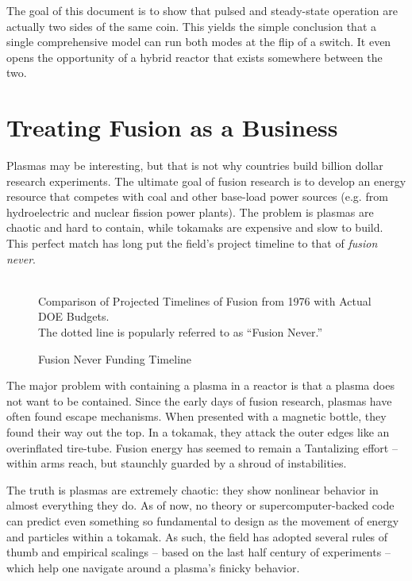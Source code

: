 The goal of this document is to show that pulsed and steady-state operation are actually two sides of the same coin. This yields the simple conclusion that a single comprehensive model can run both modes at the flip of a switch. It even opens the opportunity of a hybrid reactor that exists somewhere between the two.

\section{Treating Fusion as a Business}

Plasmas may be interesting, but that is not why countries build billion dollar research experiments. The ultimate goal of fusion research is to develop an energy resource that competes with coal and other base-load power sources (e.g. from hydroelectric and nuclear fission power plants). The problem is plasmas are chaotic and hard to contain, while tokamaks are expensive and slow to build. This perfect match has long put the field's project timeline to that of \emph{fusion never}. \cite{fusionfunding}

\begin{figure}[h]
	\centering
	\begin{adjustbox}{width=0.75\textwidth}
		
	\end{adjustbox}
	\caption{Fusion Never Funding Timeline} ~\\
	\small Comparison of Projected Timelines of Fusion from 1976 with Actual DOE Budgets. \cite{doe87,doe19} \\ The dotted line is popularly referred to as  ``Fusion Never.'' \cite{fusionnever}
\end{figure}

The major problem with containing a plasma in a reactor is that a plasma does not want to be contained. Since the early days of fusion research, plasmas have often found escape mechanisms. When presented with a magnetic bottle, they found their way out the top. In a tokamak, they attack the outer edges like an overinflated tire-tube. Fusion energy has seemed to remain a Tantalizing effort -- within arms reach, but staunchly guarded by a shroud of instabilities.

The truth is plasmas are extremely chaotic: they show nonlinear behavior in almost everything they do. As of now, no theory or supercomputer-backed code can predict even something so fundamental to design as the movement of energy and particles within a tokamak. As such, the field has adopted several rules of thumb and empirical scalings -- based on the last half century of experiments -- which help one navigate around a plasma's finicky behavior.

